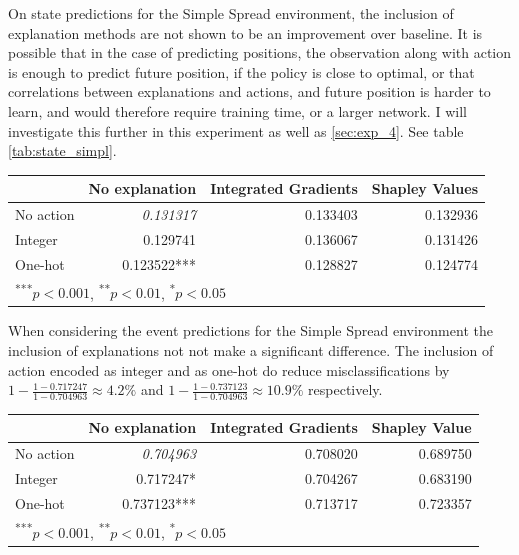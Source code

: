 \documentclass[UKenglish]{uiomasterthesis}
\begin{document}
On state predictions for the Simple Spread environment, the inclusion of explanation methods are not shown to be an improvement over baseline. It is possible that in the case of predicting positions, the observation along with action is enough to predict future position, if the policy is close to optimal, or that correlations between explanations and actions, and future position is harder to learn, and would therefore require training time, or a larger network. I will investigate this further in this experiment as well as \ref{sec:exp_4}. See table \ref{tab:state_simpl}.

\begin{center}
\label{tab:state_simpl}
\begin{tabular}{lrrr}
\toprule
& No explanation & Integrated Gradients & Shapley Values \\
\midrule
No action & \textit{0.131317} & 0.133403 & 0.132936 \\
Integer & 0.129741 & 0.136067 & 0.131426 \\
One-hot & 0.123522*** & 0.128827 & 0.124774 \\
\bottomrule
\multicolumn{3}{l}{\textsuperscript{***}$p<0.001$, 
  \textsuperscript{**}$p<0.01$, 
  \textsuperscript{*}$p<0.05$}
\end{tabular}
\end{center}

When considering the event predictions for the Simple Spread environment the inclusion of explanations not not make a significant difference. The inclusion of action encoded as integer and as one-hot do reduce misclassifications by $1-\frac{1-0.717247}{1-0.704963} \approx 4.2\%$ and $1-\frac{1-0.737123}{1-0.704963} \approx 10.9\%$ respectively.

\begin{center}
\label{tab:crit_simpl}
\begin{tabular}{lrrr}
\toprule
 & No explanation & Integrated Gradients & Shapley Value \\
 \midrule
    No action & \textit{0.704963} & 0.708020 & 0.689750 \\
Integer & 0.717247* & 0.704267 & 0.683190 \\
One-hot & 0.737123*** & 0.713717 & 0.723357 \\
\bottomrule
\multicolumn{3}{l}{\textsuperscript{***}$p<0.001$, 
  \textsuperscript{**}$p<0.01$, 
  \textsuperscript{*}$p<0.05$}
\end{tabular}
\end{center}
\end{document}
